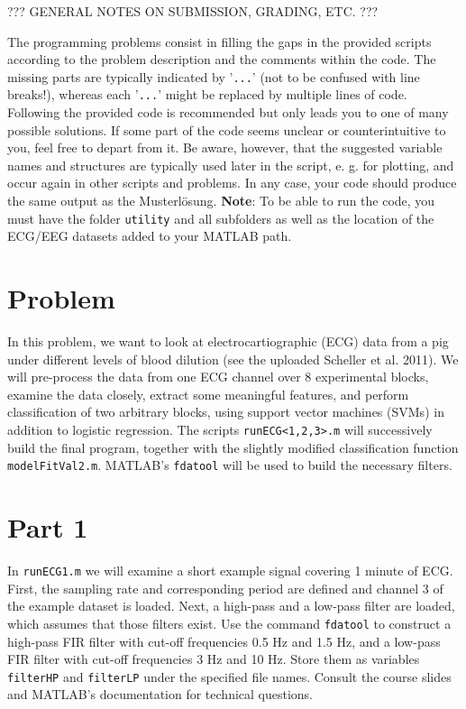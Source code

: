 \documentclass[10pt,a4paper,notitlepage]{report}
\begin{document}
??? GENERAL NOTES ON SUBMISSION, GRADING, ETC. ???

The programming problems consist in filling the gaps in the provided scripts according to the problem description and the comments within the code. The missing parts are typically indicated by '\texttt{...}' (not to be confused with line breaks!), whereas each '\texttt{...}' might be replaced by multiple lines of code. Following the provided code is recommended but only leads you to one of many possible solutions. If some part of the code seems unclear or counterintuitive to you, feel free to depart from it. Be aware, however, that the suggested variable names and structures are typically used later in the script, e. g. for plotting, and occur again in other scripts and problems. In any case, your code should produce the same output as the Musterlösung. \textbf{Note}: To be able to run the code, you must have the folder \texttt{utility} and all subfolders as well as the location of the ECG/EEG datasets added to your MATLAB path.

\section*{Problem}
In this problem, we want to look at electrocartiographic (ECG) data from a pig under different levels of blood dilution (see the uploaded Scheller et al. 2011). We will pre-process the data from one ECG channel over 8 experimental blocks, examine the data closely, extract some meaningful features, and perform classification of two arbitrary blocks, using support vector machines (SVMs) in addition to logistic regression. The scripts \texttt{runECG<1,2,3>.m} will successively build the final program, together with the slightly modified classification function \texttt{modelFitVal2.m}. MATLAB's \texttt{fdatool} will be used to build the necessary filters.

\section*{Part 1}
In \texttt{runECG1.m} we will examine a short example signal covering 1 minute of ECG. First, the sampling rate and corresponding period are defined and channel 3 of the example dataset is loaded. Next, a high-pass and a low-pass filter are loaded, which assumes that those filters exist. Use the command \texttt{fdatool} to construct a high-pass FIR filter with cut-off frequencies 0.5 Hz and 1.5 Hz, and a low-pass FIR filter with cut-off frequencies 3 Hz and 10 Hz. Store them as variables \texttt{filterHP} and \texttt{filterLP} under the specified file names. Consult the course slides and MATLAB's documentation for technical questions.
\end{document}
